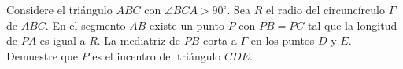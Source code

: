 Considere el triángulo $ABC$ con $\angle BCA \gt 90^{\circ}$. Sea $R$ el radio del circuncírculo $\Gamma$ de
$ABC$. En el segmento $AB$ existe un punto $P$ con $PB = PC$ tal que la longitud de $PA$ es igual a
$R$. La mediatriz de $PB$ corta a $\Gamma$ en los puntos $D$ y $E$.
Demuestre que $P$ es el incentro del triángulo $CDE$.